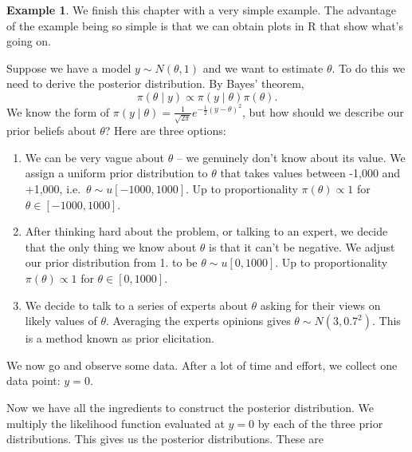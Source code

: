 \documentclass[
]{book}
\theoremstyle{definition}
\theoremstyle{definition}
\newtheorem{example}{Example}[chapter]
\theoremstyle{definition}
\theoremstyle{definition}
\theoremstyle{remark}
\begin{document}
\begin{example}

We finish this chapter with a very simple example. The advantage of the example being so simple is that we can obtain plots in R that show what's going on.

Suppose we have a model \(y \sim N(\theta, 1)\) and we want to estimate \(\theta\). To do this we need to derive the posterior distribution. By Bayes' theorem,
\[
\pi(\theta \mid y) \propto \pi(y \mid \theta) \pi(\theta).
\]
We know the form of \(\pi(y \mid \theta) = \frac{1}{\sqrt{2\pi}}e^{-\frac{1}{2}(y - \theta)^2}\), but how should we describe our prior beliefs about \(\theta\)? Here are three options:

\begin{enumerate}
\def\labelenumi{\arabic{enumi}.}
\item
  We can be very vague about \(\theta\) -- we genuinely don't know about its value. We assign a uniform prior distribution to \(\theta\) that takes values between -1,000 and +1,000, i.e.~\(\theta \sim u[-1000, 1000]\). Up to proportionality \(\pi(\theta) \propto 1\) for \(\theta \in [-1000, 1000]\).
\item
  After thinking hard about the problem, or talking to an expert, we decide that the only thing we know about \(\theta\) is that it can't be negative. We adjust our prior distribution from 1. to be \(\theta \sim u[0, 1000]\). Up to proportionality \(\pi(\theta) \propto 1\) for \(\theta \in [0, 1000]\).
\item
  We decide to talk to a series of experts about \(\theta\) asking for their views on likely values of \(\theta\). Averaging the experts opinions gives \(\theta \sim N(3, 0.7^2)\). This is a method known as prior elicitation.
\end{enumerate}

We now go and observe some data. After a lot of time and effort, we collect one data point: \(y = 0\).

Now we have all the ingredients to construct the posterior distribution. We multiply the likelihood function evaluated at \(y = 0\) by each of the three prior distributions. This gives us the posterior distributions. These are


\end{example}
\end{document}
